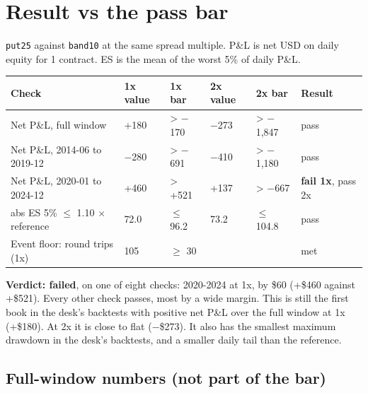 \documentclass{article}
\begin{document}
\section{Result vs the pass bar}

\texttt{put25} against \texttt{band10} at the same spread multiple. P\&L is net USD on daily equity for 1 contract. ES is the mean of the worst 5\% of daily P\&L.

\begin{center}\small
\begin{tabularx}{\linewidth}{>{\raggedright\arraybackslash}X l l l l >{\raggedright\arraybackslash}X}
\toprule
\textbf{Check} & \textbf{1x value} & \textbf{1x bar} & \textbf{2x value} & \textbf{2x bar} & \textbf{Result} \\
\midrule
Net P\&L, full window & +180 & > \ensuremath{-}170 & \ensuremath{-}273 & > \ensuremath{-}1,847 & pass \\
Net P\&L, 2014-06 to 2019-12 & \ensuremath{-}280 & > \ensuremath{-}691 & \ensuremath{-}410 & > \ensuremath{-}1,180 & pass \\
Net P\&L, 2020-01 to 2024-12 & +460 & > +521 & +137 & > \ensuremath{-}667 & \textbf{fail 1x}, pass 2x \\
abs ES 5\% \ensuremath{\leq} 1.10 \ensuremath{\times} reference & 72.0 & \ensuremath{\leq} 96.2 & 73.2 & \ensuremath{\leq} 104.8 & pass \\
Event floor: round trips (1x) & 105 & \ensuremath{\geq} 30 &  &  & met \\
\bottomrule
\end{tabularx}
\end{center}

\textbf{Verdict: failed}, on one of eight checks: 2020-2024 at 1x, by \$60 (+\$460 against +\$521). Every other check passes, most by a wide margin. This is still the first book in the desk's backtests with positive net P\&L over the full window at 1x (+\$180). At 2x it is close to flat (\ensuremath{-}\$273). It also has the smallest maximum drawdown in the desk's backtests, and a smaller daily tail than the reference.

\subsection{Full-window numbers (not part of the bar)}
\end{document}
